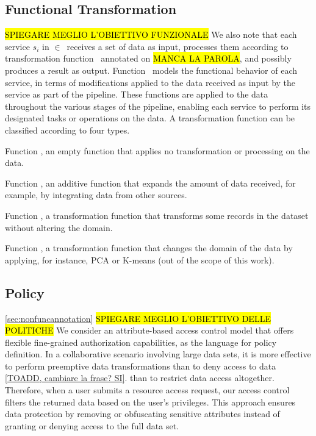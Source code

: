 \subsection{Functional Transformation}\label{sec:funcannotation}
\hl{SPIEGARE MEGLIO L'OBIETTIVO FUNZIONALE} We also note that each service $s_i$ in $\in$\V\ receives a set of data as input, processes them according to transformation function \F\ annotated on \hl{MANCA LA PAROLA}, and possibly produces a result as output.
Function \F\ models the functional behavior of each service, in terms of modifications applied to the data received as input by the service as part of the pipeline.
These functions are applied to the data throughout the various stages of the pipeline, enabling each service to perform its designated tasks or operations on the data.
A transformation function can be classified according to four types.
\begin{enumerate*}[label=\roman*)]
  \item Function , an empty function that applies no transformation or processing on the data.
  \item Function , an additive function that expands the amount of data received, for example, by integrating data from other sources.
  \item Function , a transformation function that transforms some records in the dataset without altering the domain.
  \item Function , a transformation function that changes the domain of the data by applying, for instance, PCA or K-means (out of the scope of this work).
\end{enumerate*}

\subsection{Policy}\ref{sec:nonfuncannotation}
\hl{SPIEGARE MEGLIO L'OBIETTIVO DELLE POLITICHE} 
We consider an attribute-based access control model that offers flexible fine-grained authorization capabilities, as the language for policy definition.
In a collaborative scenario involving large
data sets, it is more effective to perform preemptive data transformations than to deny access to data \cref{TOADD, cambiare la frase? SI}.
than to restrict data access altogether.
Therefore, when a user submits a resource access request, our access
control filters the returned data based on the user's privileges.
This approach ensures data protection by removing or obfuscating sensitive attributes instead of granting or denying access to the full data set.


